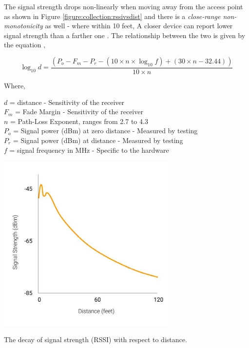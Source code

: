 The signal strength drops non-linearly when moving away from the access point as shown in Figure \ref{figure:collection:rssivsdist} and there is a \textit{close-range non-monotonicity} as well - where within 10 feet, A closer device can report lower signal strength than a farther one \citep{cisco2008}.
The relationship between the two is given by the equation \cite{rssieq},

\begin{equation}
  \log_{10}{d} = \frac{(P_o - F_m - P_r - (10 \times n \times \log_{10}{f}) + ( 30 \times n - 32.44))}{10\times n}
  \label{equation:rssi:hard}
\end{equation}

Where,

\noindent
\(d\) = distance - Sensitivity of the receiver \\
\(F_m\) = Fade Margin - Sensitivity of the receiver \\
\(n\) = Path-Loss Exponent, ranges from 2.7 to 4.3 \\
\(P_o\) = Signal power (dBm) at zero distance - Measured by testing \\
\(P_r\) = Signal power (dBm) at distance - Measured by testing \\
\(f\) = signal frequency in MHz - Specific to the hardware \\

\vspace{1em}

\begin{marginfigure}
  \forcerectofloat
  \includegraphics{images/rssi-vs-dist.jpeg}
  \caption{The decay of signal strength (RSSI) with respect to distance.}
  \label{figure:collection:rssivsdist}
\end{marginfigure}

